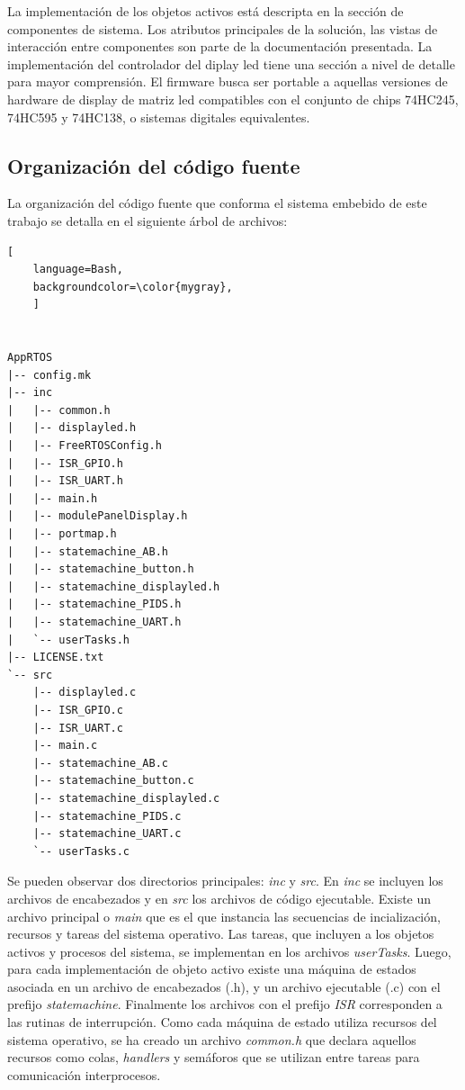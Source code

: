 La implementación de los objetos activos está descripta en la sección de componentes de sistema. Los atributos principales de la solución, las vistas de interacción entre componentes son parte de la documentación presentada. La implementación del controlador del diplay led tiene una sección a nivel de detalle para mayor comprensión. El firmware busca ser portable a aquellas versiones de hardware de display de matriz led compatibles con el conjunto de chips 74HC245, 74HC595 y 74HC138, o sistemas digitales equivalentes. \\



\subsection{Organización del código fuente}
La organización del código fuente que conforma el sistema embebido de este trabajo se detalla en el siguiente árbol de archivos:

\begin{lstlisting}[
	language=Bash, 
	backgroundcolor=\color{mygray},
	]
	
	
AppRTOS
|-- config.mk
|-- inc
|   |-- common.h
|   |-- displayled.h
|   |-- FreeRTOSConfig.h
|   |-- ISR_GPIO.h
|   |-- ISR_UART.h
|   |-- main.h
|   |-- modulePanelDisplay.h
|   |-- portmap.h
|   |-- statemachine_AB.h
|   |-- statemachine_button.h
|   |-- statemachine_displayled.h
|   |-- statemachine_PIDS.h
|   |-- statemachine_UART.h
|   `-- userTasks.h
|-- LICENSE.txt
`-- src
    |-- displayled.c
    |-- ISR_GPIO.c
    |-- ISR_UART.c
    |-- main.c
    |-- statemachine_AB.c
    |-- statemachine_button.c
    |-- statemachine_displayled.c
    |-- statemachine_PIDS.c
    |-- statemachine_UART.c
    `-- userTasks.c
\end{lstlisting}

Se pueden observar dos directorios principales: \textit{inc} y \textit{src}. En \textit{inc} se incluyen los archivos de encabezados y en \textit{src} los archivos de código ejecutable. Existe un archivo principal o \textit{main} que es el que instancia las secuencias de incialización, recursos y tareas del sistema operativo. Las tareas, que incluyen a los objetos activos y procesos del sistema, se implementan en los archivos \textit{userTasks}. Luego, para cada implementación de objeto activo existe una máquina de estados asociada en un archivo de encabezados (.h),  y un archivo ejecutable (.c) con el prefijo \textit{statemachine}. Finalmente los archivos con el prefijo \textit{ISR} corresponden a las rutinas de interrupción. Como cada máquina de estado utiliza recursos del sistema operativo, se ha creado un archivo \textit{common.h} que declara aquellos recursos como colas, \textit{handlers} y semáforos que se utilizan entre tareas para comunicación interprocesos.\\

